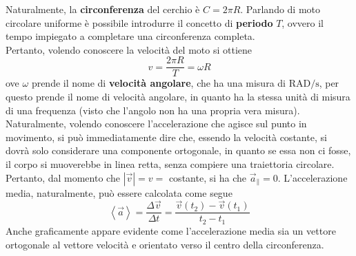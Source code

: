 \documentclass[a4paper]{extarticle}
\begin{document}
\vspace{1em}
\noindent
Naturalmente, la \textbf{circonferenza} del cerchio è $C = 2\pi R$. Parlando di moto circolare uniforme è possibile introdurre il concetto di \textbf{periodo} $T$, ovvero il tempo impiegato a completare una circonferenza completa.\\
Pertanto, volendo conoscere la velocità del moto si ottiene
\[\boxed{v = \frac{2\pi R}{T} = \omega R}\]
ove $\omega$ prende il nome di \textbf{velocità angolare}, che ha una misura di $\text{RAD}/\text{s}$, per questo prende il nome di velocità angolare, in quanto ha la stessa unità di misura di una frequenza (visto che l'angolo non ha una propria vera misura).\\
Naturalmente, volendo conoscere l'accelerazione che agisce sul punto in movimento, si può immediatamente dire che, essendo la velocità costante, si dovrà solo considerare una componente ortogonale, in quanto se essa non ci fosse, il corpo si muoverebbe in linea retta, senza compiere una traiettoria circolare.\\
Pertanto, dal momento che $\left \vert \vec{v} \right \vert = v =$ costante, si ha che $\vec{a}_\parallel = 0$. L'accelerazione media, naturalmente, può essere calcolata come segue
\[\boxed{\left<\vec{a}\right> = \frac{\Delta \vec{v}}{\Delta t} = \frac{\vec{v}(t_2) - \vec{v}(t_1)}{t_2 - t_1}}\]
Anche graficamente appare evidente come l'accelerazione media sia un vettore ortogonale al vettore velocità e orientato verso il centro della circonferenza.\\
\end{document}
